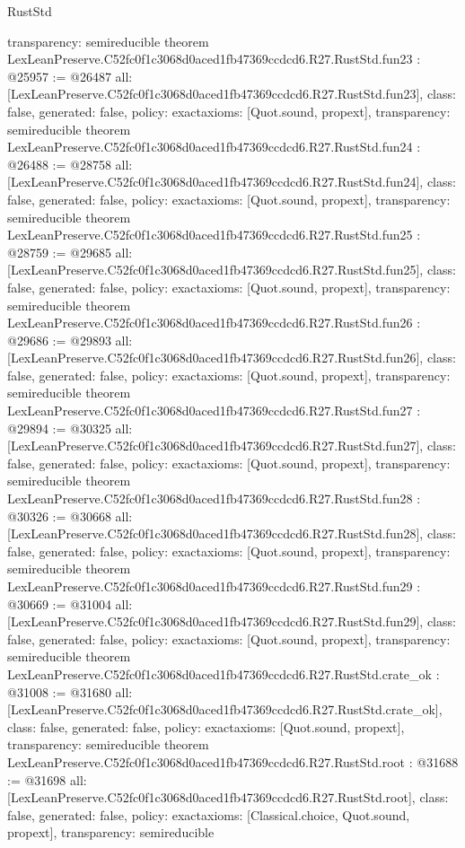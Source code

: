 \begin{lexlean}{RustStd}
\begin{coremodule}
{  transparency: semireducible
}
theorem LexLeanPreserve.C52fc0f1c3068d0aced1fb47369ccdcd6.R27.RustStd.fun23 : @25957 := @26487 {
  all: [LexLeanPreserve.C52fc0f1c3068d0aced1fb47369ccdcd6.R27.RustStd.fun23],
  class: false,
  generated: false,
  policy: exact{axioms: [Quot.sound, propext]},
  transparency: semireducible
}
theorem LexLeanPreserve.C52fc0f1c3068d0aced1fb47369ccdcd6.R27.RustStd.fun24 : @26488 := @28758 {
  all: [LexLeanPreserve.C52fc0f1c3068d0aced1fb47369ccdcd6.R27.RustStd.fun24],
  class: false,
  generated: false,
  policy: exact{axioms: [Quot.sound, propext]},
  transparency: semireducible
}
theorem LexLeanPreserve.C52fc0f1c3068d0aced1fb47369ccdcd6.R27.RustStd.fun25 : @28759 := @29685 {
  all: [LexLeanPreserve.C52fc0f1c3068d0aced1fb47369ccdcd6.R27.RustStd.fun25],
  class: false,
  generated: false,
  policy: exact{axioms: [Quot.sound, propext]},
  transparency: semireducible
}
theorem LexLeanPreserve.C52fc0f1c3068d0aced1fb47369ccdcd6.R27.RustStd.fun26 : @29686 := @29893 {
  all: [LexLeanPreserve.C52fc0f1c3068d0aced1fb47369ccdcd6.R27.RustStd.fun26],
  class: false,
  generated: false,
  policy: exact{axioms: [Quot.sound, propext]},
  transparency: semireducible
}
theorem LexLeanPreserve.C52fc0f1c3068d0aced1fb47369ccdcd6.R27.RustStd.fun27 : @29894 := @30325 {
  all: [LexLeanPreserve.C52fc0f1c3068d0aced1fb47369ccdcd6.R27.RustStd.fun27],
  class: false,
  generated: false,
  policy: exact{axioms: [Quot.sound, propext]},
  transparency: semireducible
}
theorem LexLeanPreserve.C52fc0f1c3068d0aced1fb47369ccdcd6.R27.RustStd.fun28 : @30326 := @30668 {
  all: [LexLeanPreserve.C52fc0f1c3068d0aced1fb47369ccdcd6.R27.RustStd.fun28],
  class: false,
  generated: false,
  policy: exact{axioms: [Quot.sound, propext]},
  transparency: semireducible
}
theorem LexLeanPreserve.C52fc0f1c3068d0aced1fb47369ccdcd6.R27.RustStd.fun29 : @30669 := @31004 {
  all: [LexLeanPreserve.C52fc0f1c3068d0aced1fb47369ccdcd6.R27.RustStd.fun29],
  class: false,
  generated: false,
  policy: exact{axioms: [Quot.sound, propext]},
  transparency: semireducible
}
theorem LexLeanPreserve.C52fc0f1c3068d0aced1fb47369ccdcd6.R27.RustStd.crate_ok : @31008 := @31680 {
  all: [LexLeanPreserve.C52fc0f1c3068d0aced1fb47369ccdcd6.R27.RustStd.crate_ok],
  class: false,
  generated: false,
  policy: exact{axioms: [Quot.sound, propext]},
  transparency: semireducible
}
theorem LexLeanPreserve.C52fc0f1c3068d0aced1fb47369ccdcd6.R27.RustStd.root : @31688 := @31698 {
  all: [LexLeanPreserve.C52fc0f1c3068d0aced1fb47369ccdcd6.R27.RustStd.root],
  class: false,
  generated: false,
  policy: exact{axioms: [Classical.choice, Quot.sound, propext]},
  transparency: semireducible
}


\end{coremodule}
\end{lexlean}
